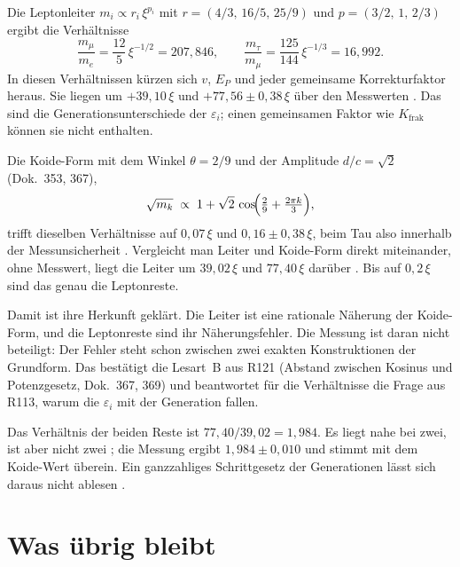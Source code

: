 Die Leptonleiter $m_i\propto r_i\,\xi^{p_i}$ mit $r=(4/3,\,16/5,\,25/9)$ und $p=(3/2,\,1,\,2/3)$ ergibt
die Verhältnisse
\begin{equation}
  \frac{m_\mu}{m_e}=\frac{12}{5}\,\xi^{-1/2}=207{,}846,\qquad
  \frac{m_\tau}{m_\mu}=\frac{125}{144}\,\xi^{-1/3}=16{,}992 .
\end{equation}
In diesen Verhältnissen kürzen sich $v$, $E_P$ und jeder gemeinsame Korrekturfaktor heraus. Sie
liegen um $+39{,}10\,\xi$ und $+77{,}56\pm0{,}38\,\xi$ über den Messwerten \KM. Das sind die
Generationsunterschiede der $\varepsilon_i$; einen gemeinsamen Faktor wie $K_{\text{frak}}$ können
sie nicht enthalten.

Die Koide-Form mit dem Winkel $\theta=2/9$ und der Amplitude $d/c=\sqrt2$ (Dok.~353, 367),
\begin{equation}
  \sqrt{m_k}\;\propto\;1+\sqrt2\,\cos\!\Bigl(\tfrac29+\tfrac{2\pi k}{3}\Bigr),
\end{equation}
trifft dieselben Verhältnisse auf $0{,}07\,\xi$ und $0{,}16\pm0{,}38\,\xi$, beim Tau also innerhalb
der Messunsicherheit \KM. Vergleicht man Leiter und Koide-Form direkt miteinander, ohne Messwert,
liegt die Leiter um $39{,}02\,\xi$ und $77{,}40\,\xi$ darüber \KM. Bis auf $0{,}2\,\xi$ sind das genau
die Leptonreste.

Damit ist ihre Herkunft geklärt. Die Leiter ist eine rationale Näherung der Koide-Form, und die
Leptonreste sind ihr Näherungsfehler. Die Messung ist daran nicht beteiligt: Der Fehler steht schon
zwischen zwei exakten Konstruktionen der Grundform. Das bestätigt die Lesart~B aus R121 (Abstand
zwischen Kosinus und Potenzgesetz, Dok.~367, 369) und beantwortet für die Verhältnisse die Frage aus
R113, warum die $\varepsilon_i$ mit der Generation fallen.

Das Verhältnis der beiden Reste ist $77{,}40/39{,}02=1{,}984$. Es liegt nahe bei zwei, ist aber nicht
zwei \KM; die Messung ergibt $1{,}984\pm0{,}010$ und stimmt mit dem Koide-Wert überein. Ein
ganzzahliges Schrittgesetz der Generationen lässt sich daraus nicht ablesen \XM.

\section{Was übrig bleibt}

